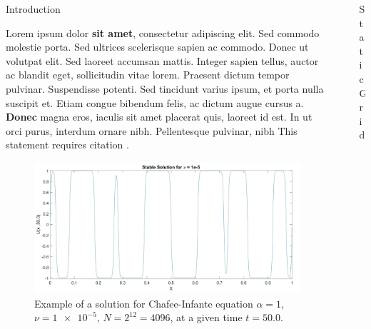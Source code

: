 \documentclass[final]{beamer}
\newlength{\sepwid}
\newlength{\onecolwid}
\begin{document}
\begin{frame}[t]
\begin{columns}[t]
\begin{column}{\onecolwid}

\begin{block}{Introduction}

Lorem ipsum dolor \textbf{sit amet}, consectetur adipiscing elit. Sed commodo molestie porta. Sed ultrices scelerisque sapien ac commodo. Donec ut volutpat elit. Sed laoreet accumsan mattis. Integer sapien tellus, auctor ac blandit eget, sollicitudin vitae lorem. Praesent dictum tempor pulvinar. Suspendisse potenti. Sed tincidunt varius ipsum, et porta nulla suscipit et. Etiam congue bibendum felis, ac dictum augue cursus a. \textbf{Donec} magna eros, iaculis sit amet placerat quis, laoreet id est. In ut orci purus, interdum ornare nibh. Pellentesque pulvinar, nibh 
This statement requires citation \cite{Smith:2012qr}.

\end{block}


\begin{figure}
\includegraphics[width=1.05\linewidth]{Example.jpg}
\caption{Example of a solution for Chafee-Infante equation $\alpha = 1$, $\nu=\num{1e-5}$,  $N = 2^{12}=4096$, at a given time $t=50.0$.}
\label{fig:example}
\end{figure}


\end{column} %

\begin{column}{\sepwid}\end{column} %
\begin{column}{\onecolwid}
\begin{block}{Static Grid}
	

\end{block}
\end{column}
\end{columns}
\end{frame}
\end{document}
